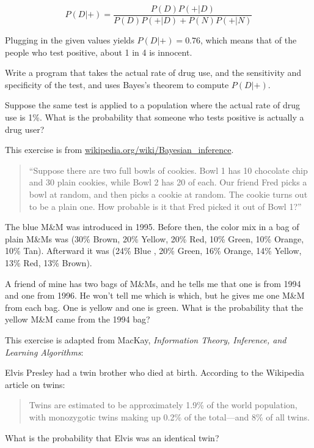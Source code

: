 \documentclass[12pt]{book}
\begin{document}
\[ P(D|+) = \frac{P(D) P(+|D)}{P(D) P(+|D) + P(N) P(+|N)}\]

Plugging in the given values yields $P(D|+) = 0.76$, which means
that of the people who test positive, about 1 in 4 is innocent. 

\begin{ex}

Write a program that takes the actual rate of drug use, and the
sensitivity and specificity of the test, and uses Bayes's theorem
to compute $P(D|+)$.

Suppose the same test is applied to a population where the actual
rate of drug use is 1\%.  What is the probability that someone
who tests positive is actually a drug user?

\end{ex}


\begin{ex}

This exercise is from \url{wikipedia.org/wiki/Bayesian_inference}.

\begin{quote}

``Suppose there are two full bowls of cookies. Bowl 1 has 10 chocolate
  chip and 30 plain cookies, while Bowl 2 has 20 of each. Our friend
  Fred picks a bowl at random, and then picks a cookie at random. The
  cookie turns out to be a plain one. How probable is it that Fred
  picked it out of Bowl 1?''

\end{quote}

\end{ex}

\begin{ex}

The blue M\&M was introduced in 1995.  Before then, the color mix in
a bag of plain M\&Ms was (30\% Brown, 20\% Yellow, 20\% Red, 10\%
Green, 10\% Orange, 10\% Tan).  Afterward it was (24\% Blue , 20\%
Green, 16\% Orange, 14\% Yellow, 13\% Red, 13\% Brown).

A friend of mine has two bags of M\&Ms, and he tells me
that one is from 1994 and one from 1996.  He won't tell me which is
which, but he gives me one M\&M from each bag.  One is yellow and
one is green.  What is the probability that the yellow M\&M came
from the 1994 bag?
  
\end{ex}

\begin{ex}

This exercise is adapted from MacKay, {\em Information
  Theory, Inference, and Learning Algorithms}:

Elvis Presley had a twin brother who died at birth.  According to the
Wikipedia article on twins:

\begin{quote}
Twins are estimated to be approximately 1.9\% of the world population,
with monozygotic twins making up 0.2\% of the total---and 8\% of all
twins.
\end{quote}

What is the probability that Elvis was an identical twin?

\end{ex}
\end{document}
